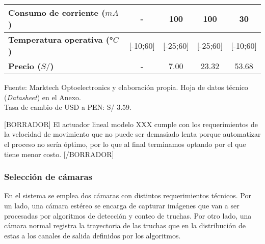 \begin{mytable}[H]
\begin{tabular}{l|c|c|c|c|}
		\multicolumn{1}{|l|}{
			\begin{minipage}{\myforthmaxsizeofcontenttable}	
				\textbf{Consumo de corriente ($mA$)}
			\end{minipage}
		} & -  & 100 & 100 & 30         \\ \hline
		\multicolumn{1}{|l|}{
			\begin{minipage}{\myforthmaxsizeofcontenttable}	
				\textbf{Temperatura operativa (°$C$)}
			\end{minipage}
		} & [-10;60] & [-25;60] & [-25;60] & [-10;60] \\ \hline
		\multicolumn{1}{|l|}{
			\begin{minipage}{\myforthmaxsizeofcontenttable}	
				\textbf{Precio ($S/$)}
			\end{minipage}
		} & - & 7.00 & 23.32 & 53.68 \\ \hline
	\end{tabular}
	\begin{flushleft}	
		Fuente: Marktech Optoelectronics y elaboración propia. Hoja de datos técnico (\textit{Datasheet}) en el Anexo.\\
		Tasa de cambio de USD a PEN: S/ 3.59.
	\end{flushleft}
\end{mytable}

[BORRADOR] El actuador lineal modelo XXX cumple con los requerimientos de la velocidad de movimiento que no puede ser demasiado lenta porque automatizar el proceso no sería óptimo, por lo que al final terminamos optando por el que tiene menor costo. [/BORRADOR]

\subsubsection{Selección de cámaras} 

En el sistema se emplea dos cámaras con distintos requerimientos técnicos. Por un lado, una cámara estéreo se encarga de capturar imágenes que van a ser procesadas por algoritmos de detección y conteo de truchas. Por otro lado, una cámara normal registra la trayectoria de las truchas que en la distribución de estas a los canales de salida definidos por los algoritmos. 

